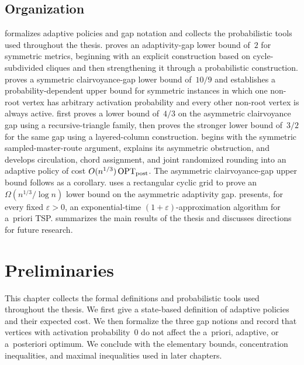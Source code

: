 \documentclass[12pt,a4paper,oneside]{report}
\begin{document}
\section{Organization}\label{sec:organization}

 formalizes adaptive policies and gap notation and
collects the probabilistic tools used throughout the thesis.
 proves an adaptivity-gap lower bound of~$2$ for symmetric metrics, beginning with an explicit construction based on cycle-subdivided cliques and then strengthening it through a probabilistic construction.
 proves a symmetric clairvoyance-gap lower bound of~$10/9$
and establishes a probability-dependent upper bound for symmetric instances in
which one non-root vertex has arbitrary activation probability and every other
non-root vertex is always active.
 first proves a lower bound of~$4/3$ on the asymmetric
clairvoyance gap using a recursive-triangle family, then proves the stronger
lower bound of~$3/2$ for the same gap using a layered-column construction.
 begins with the symmetric sampled-master-route argument,
explains its asymmetric obstruction, and develops circulation, chord
assignment, and joint randomized rounding into an adaptive policy of cost
$O(n^{1/3})\operatorname{OPT}_\mathrm{post}$.  The asymmetric clairvoyance-gap upper bound follows as
a corollary.
 uses a rectangular cyclic grid to prove an
$\Omega(n^{1/3}/\log n)$ lower bound on the asymmetric adaptivity gap.
 presents, for every fixed $\varepsilon>0$, an exponential-time
$(1{+}\varepsilon)$-approximation algorithm for a~priori TSP.
 summarizes the main results of the thesis and discusses
directions for future research.

\chapter{Preliminaries}\label{ch:preliminaries}

This chapter collects the formal definitions and probabilistic tools used
throughout the thesis. We first give a state-based definition of adaptive
policies and their expected cost. We then formalize the three gap notions and
record that vertices with activation probability~$0$ do not affect the
a~priori, adaptive, or a~posteriori optimum. We conclude with the elementary
bounds, concentration inequalities, and maximal inequalities used in later
chapters.
\end{document}
